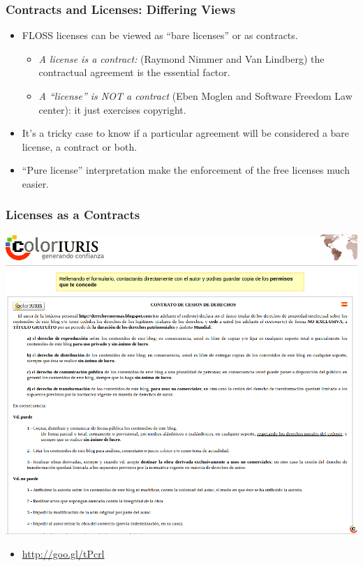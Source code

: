 \documentclass{beamer}
\begin{document}

\begin{frame}
\frametitle{Contracts and Licenses: Differing Views}

\begin{itemize}
\item FLOSS licenses can be viewed as ``bare \alert{licenses}'' or as \alert{contracts}.
	\begin{itemize}
	\item \textit{A license is a contract:} (Raymond Nimmer and Van Lindberg) the contractual agreement is the essential factor. 
	\item \textit{A ``license'' is NOT a contract} (Eben Moglen and Software Freedom Law center): it just exercises copyright.
	\end{itemize}
\item It's a tricky case to know if a particular agreement will be considered a bare license, a contract  or both.
\item ``Pure license'' interpretation make the enforcement of the free licenses much easier.
\end{itemize}

\end{frame}



\begin{frame}
\frametitle{Licenses as a Contracts}
\begin{center}
\vspace{-0.5cm}
\includegraphics[scale=0.18,clip=true]{figs/coloriuris.png}

\begin{itemize}
\item \url{http://goo.gl/tPcrl}
\end{itemize}
\end{center}
\end{frame}
\end{document}
